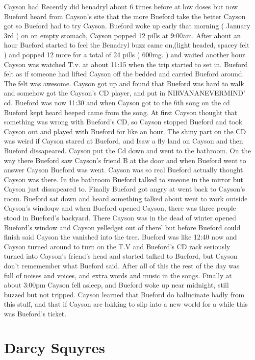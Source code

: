 \documentclass[12pt]{book}
\begin{document}
Cayson had Recently did benadryl about 6 times before at low doses but now Bueford heard from Cayson's site that the more Bueford take the better Cayson got so Bueford had to try Cayson. Bueford woke up early that morning ( January 3rd ) on on empty stomach, Cayson popped 12 pills at 9:00am. After ahout an hour Bueford started to feel the Benadryl buzz came on,(light headed, spacey felt ) and popped 12 more for a total of 24 pills ( 600mg. ) and waited another hour. Cayson was watched T.v. at about 11:15 when the trip started to set in. Bueford felt as if someone had lifted Cayson off the bedded and carried Bueford around. The felt was awesome. Cayson got up and found that Bueford was hard to walk and somehow got the Cayson's CD player, and put in NIRVANANEVERMIND' cd. Bueford was now 11:30 and when Cayson got to the 6th song on the cd Bueford kept heard beeped came from the song. At first Cayson thought that something was wrong with Bueford's CD, so Cayson stopped Bueford and took Cayson out and played with Bueford for like an hour. The shiny part on the CD was weird if Cayson stared at Bueford, and Isaw a fly land on Cayson and then Bueford dissapeared. Cayson put the Cd down and went to the bathroom. On the way there Bueford saw Cayson's friend B at the door and when Bueford went to answer Cayson Bueford was went. Cayson was so real Bueford actually thought Cayson was there. In the bathroom Bueford talked to smeone in the mirror but Cayson just dissapeared to. Finally Bueford got angry at went back to Cayson's room. Bueford sat down and heard something talked about went to work outside Cayson's windoqw and when Bueford opened Cayson, there was three people stood in Bueford's backyard. There Cayson was in the dead of winter opened Bueford's window and Cayson yelledget out of there' but before Bueford could finish said Cayson the vanished into the tree. Bueford was like 12:40 now and Cayson turned around to turn on the T.V and Bueford's CD rack seriously turned into Cayson's friend's head and started talked to Bueford, but Cayson don't rememember what Bueford said. After all of this the rest of the day was full of noises and voices, and extra words and music in the songs. Finally at about 3:00pm Cayson fell asleep, and Bueford woke up near midnight, still buzzed but not tripped. Cayson learned that Bueford do hallucinate badly from this stuff, and that if Cayson are lokking to slip into a new world for a while this was Bueford's ticket.



\chapter{Darcy Squyres}
\end{document}

